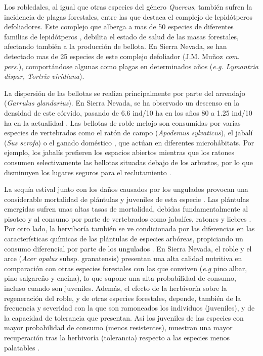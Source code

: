 Los robledales, al igual que otras especies del género \emph{Quercus}, también sufren la incidencia de plagas forestales, entre las que destaca el complejo de lepidótperos defoliadores. Este complejo que alberga a mas de 50 especies de diferentes familias de lepidótperos \autocites{Soria1988RelacionLepidopteros,Soria1987LepidopterosDefoliadores}, debilita el estado de salud de las masas forestales, afectando también a la producción de bellota. En Sierra Nevada, se han detectado mas de 25 especies de este complejo defoliador (J.M. Muñoz \emph{com. pers.}), comportándose algunas como plagas en determinados años (\emph{e.g. Lymantria dispar, Tortrix viridiana}).  

La dispersión de las bellotas se realiza principalmente por parte del arrendajo (\emph{Garrulus glandarius}). En Sierra Nevada, se ha observado un descenso en la densidad de este córvido, pasando de 6.6 ind/10 ha en los años 80 a 1.25 ind/10 ha en la actualidad \autocites{ZamoraBareaAzcon2015LongTermChanges}. Las bellotas de roble melojo son consumidas por varias especies de vertebrados como el ratón de campo (\emph{Apodemus sylvaticus}), el jabalí (\emph{Sus scrofa}) o el ganado doméstico \autocites{Pereaetal2014InteraccionesPlantaanimal,Gomezetal2001ProblemasRegeneracion}, que actúan en diferentes microhábitats. Por ejemplo, los jabalís prefieren los espacios abiertos mientras que los ratones consumen selectivamente las bellotas situadas debajo de los arbustos, por lo que disminuyen los lugares seguros para el reclutamiento \autocite{Gomez2003ImpactVertebrate}. 

La sequía estival junto con los daños causados por los ungulados provocan una considerable mortalidad de plántulas y juveniles de esta especie \autocites{Pereaetal2014InteraccionesPlantaanimal,Barazaetal2004HerbivoryHas}. Las plántulas emergidas sufren unas altas tasas de mortalidad, debidas fundamentalmente al pisoteo y al consumo por parte de vertebrados como jabalíes, ratones y liebres \autocites{Pereaetal2014InteraccionesPlantaanimal,Gomez2003ImpactVertebrate}. Por otro lado, la herviboría también se ve condicionada por las diferencias en las características químicas de las plántulas de especies arbóreas, propiciando un consumo diferencial por parte de los ungulados \autocites{Baraza2005EfectoPequenos,Barazaetal2007InfluenciaCaracteristicas,Barazaetal2004HerbivoryHas}. En Sierra Nevada, el roble y el arce (\emph{Acer opalus} subsp. {granatensis}) presentan una alta calidad nutritiva en comparación con otras especies forestales con las que conviven (\emph{e.g} pino albar, pino salgareño y encina), lo que supone una alta probabilidad de consumo, incluso cuando son juveniles. Además, el efecto de la herbivoría sobre la regeneración del roble, y de otras especies forestales, depende, también de la frecuencia y severidad con la que son ramoneados los individuos (juveniles), y de la capacidad de tolerancia que presentan. Así los juveniles de las especies con mayor probabilidad de consumo (menos resistentes), muestran una mayor recuperación tras la herbivoría (tolerancia) respecto a las especies menos palatables \autocite{Barazaetal2007InfluenciaCaracteristicas}.   

